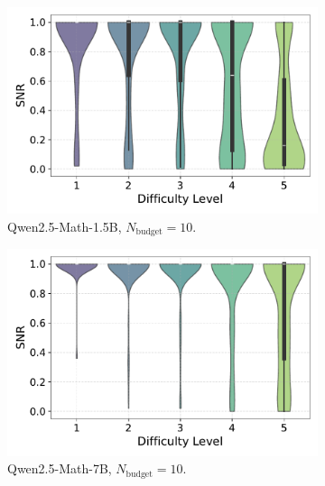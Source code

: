 \begin{figure}[h!]
  \centering
  \begin{subfigure}{0.49\textwidth}
      \centering
      \includegraphics[width=\textwidth]{figs/QWEN-MATH-1.5B_violin_maj10_SNR_01.pdf}
      \caption{Qwen2.5-Math-1.5B, $N_{\text{budget}}=10$.}
      \label{fig:QWEN-MATH-1.5B_budget_10_SNR_01}
  \end{subfigure}
  \hfill
  \begin{subfigure}{0.49\textwidth}
      \centering
      \includegraphics[width=\textwidth]{figs/QWEN-MATH-7B_violin_maj10_SNR_01.pdf}
        \caption{Qwen2.5-Math-7B, $N_{\text{budget}}=10$.}
      \label{fig:QWEN-MATH-7B_budget_10_SNR_01}
  \end{subfigure}
  \vfill
  \begin{subfigure}{0.49\textwidth}
      \centering

\end{subfigure}
\end{figure}

